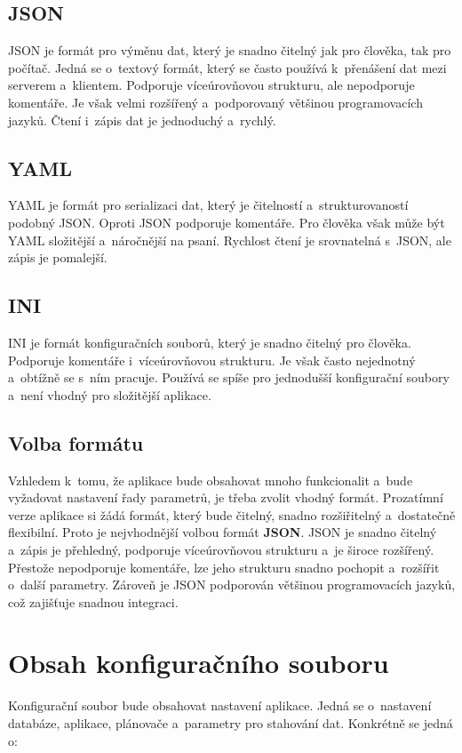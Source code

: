 \subsection{JSON}
\cite{cisco_xml_json_yaml}
JSON je formát pro výměnu dat, který je snadno čitelný jak pro člověka, tak pro počítač.
Jedná se o~textový formát, který se často používá k~přenášení dat mezi serverem a~klientem.
Podporuje víceúrovňovou strukturu, ale nepodporuje komentáře.
Je však velmi rozšířený a~podporovaný většinou programovacích jazyků.
Čtení i~zápis dat je jednoduchý a~rychlý.

\subsection{YAML}
\cite{cisco_xml_json_yaml}
YAML je formát pro serializaci dat, který je čitelností a~strukturovaností podobný JSON.
Oproti JSON podporuje komentáře.
Pro člověka však může být YAML složitější a~náročnější na psaní.
Rychlost čtení je srovnatelná s~JSON, ale zápis je pomalejší.

\subsection{INI}
INI je formát konfiguračních souborů, který je snadno čitelný pro člověka.
Podporuje komentáře i~víceúrovňovou strukturu.
Je však často nejednotný a~obtížně se s~ním pracuje.
Používá se spíše pro jednodušší konfigurační soubory a~není vhodný pro složitější aplikace.

\subsection{Volba formátu}
Vzhledem k~tomu, že aplikace bude obsahovat mnoho funkcionalit a~bude vyžadovat nastavení řady parametrů, je třeba zvolit vhodný formát.
Prozatímní verze aplikace si žádá formát, který bude čitelný, snadno rozšiřitelný a~dostatečně flexibilní.
Proto je nejvhodnější volbou formát \textbf{JSON}.
JSON je snadno čitelný a~zápis je přehledný, podporuje víceúrovňovou strukturu a~je široce rozšířený.
Přestože nepodporuje komentáře, lze jeho strukturu snadno pochopit a~rozšířit o~další parametry.
Zároveň je JSON podporován většinou programovacích jazyků, což zajišťuje snadnou integraci.

\newpage

\section{Obsah konfiguračního souboru}
Konfigurační soubor bude obsahovat nastavení aplikace.
Jedná se o~nastavení databáze, aplikace, plánovače a~parametry pro stahování dat.
Konkrétně se jedná o:

